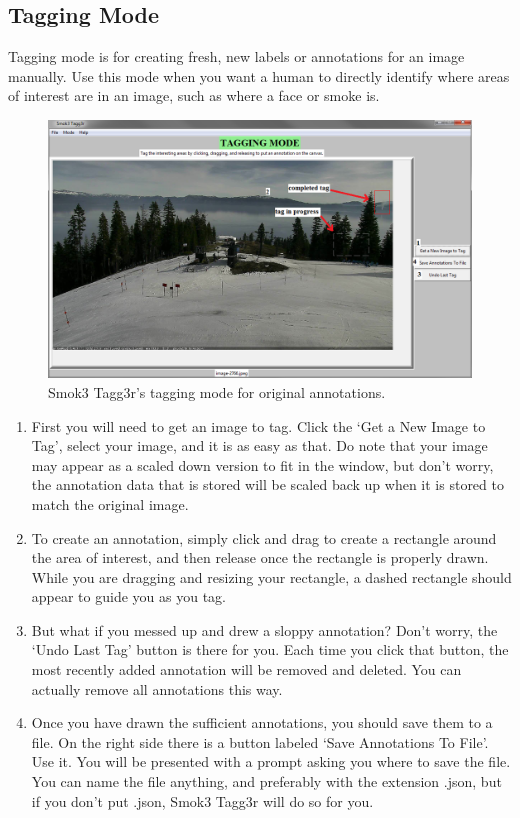 \documentclass{article}
\begin{document}
\subsection{Tagging Mode}
Tagging mode is for creating fresh, new labels or annotations for an image manually. Use this mode when you want a human to directly identify where areas of interest are in an image, such as where a face or smoke is.

  \begin{figure}[h!]
    \centering
    \includegraphics[width=.9\linewidth]{tagging_mode}
    \caption{Smok3 Tagg3r's tagging mode for original annotations.}
    \label{fig:tagging_mode}
  \end{figure}

\begin{enumerate}
  \item First you will need to get an image to tag. Click the `Get a New Image to Tag', select your image, and it is as easy as that. Do note that your image may appear as a scaled down version to fit in the window, but don't worry, the annotation data that is stored will be scaled back up when it is stored to match the original image.

  \item To create an annotation, simply click and drag to create a rectangle around the area of interest, and then release once the rectangle is properly drawn. While you are dragging and resizing your rectangle, a dashed rectangle should appear to guide you as you tag.

  \item But what if you messed up and drew a sloppy annotation? Don't worry, the `Undo Last Tag' button is there for you. Each time you click that button, the most recently added annotation will be removed and deleted. You can actually remove all annotations this way.

  \item Once you have drawn the sufficient annotations, you should save them to a file. On the right side there is a button labeled `Save Annotations To File'. Use it. You will be presented with a prompt asking you where to save the file. You can name the file anything, and preferably with the extension .json, but if you don't put .json, Smok3 Tagg3r will do so for you.
\end{enumerate}
\end{document}
